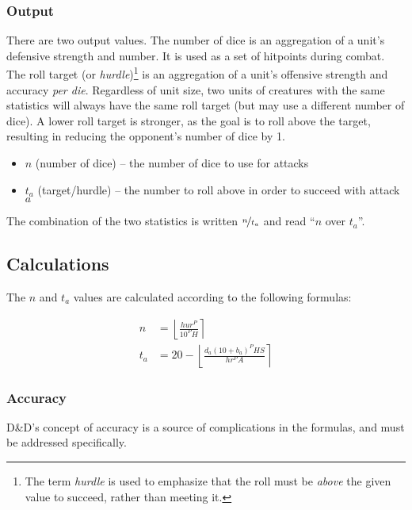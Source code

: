\documentclass[twocolumn]{article}
\begin{document}
\subsubsection{Output}

There are two output values.
The number of dice is an aggregation of a unit's defensive strength and number.
It is used as a set of hitpoints during combat.
The roll target (or \emph{hurdle})\footnote{
    The term \emph{hurdle} is used to emphasize
    that the roll must be \emph{above} the given value to succeed,
    rather than meeting it.
}
is an aggregation
of a unit's offensive strength and accuracy \emph{per die}.
Regardless of unit size,
two units of creatures with the same statistics
will always have the same roll target
(but may use a different number of dice).
A lower roll target is stronger,
as the goal is to roll above the target,
resulting in reducing the opponent's number of dice by 1.

\begin{itemize}
    \item $n$ (number of dice) -- the number of dice to use for attacks
    \item $t_a$ (target/hurdle) -- the number to roll above in order to succeed with attack $a$
\end{itemize}

The combination of the two statistics is written $\nicefrac{n}{t_a}$
and read ``$n$ over $t_a$''.

\subsection{Calculations}

The $n$ and $t_a$ values are calculated according to the following formulas:

\begin{align*}
    n   &=  
        \left\lfloor
            \frac
                {h u r^P}
                {10^P H}
        \right\rceil \\
    t_a &=
        20 -
        \left\lfloor
            \frac
                {d_a (10 + b_{a})^P H S}
                {h r^P A}
        \right\rceil
\end{align*}

\subsubsection{Accuracy}

D\&D's concept of accuracy is a source of complications in the formulas,
and must be addressed specifically.
\end{document}
